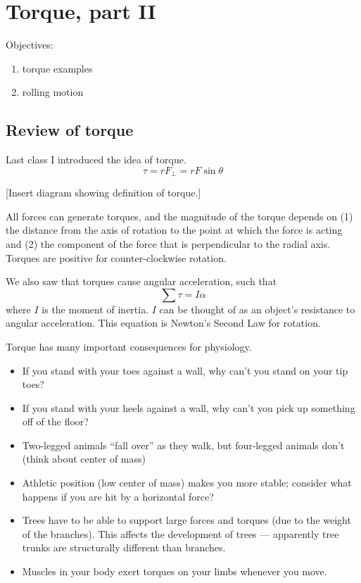 \section{Torque, part II}
Objectives:
\begin{enumerate}
\item torque examples
\item rolling motion
\end{enumerate}

\hrulefill

\subsection{Review of torque}
Last class I introduced the idea of torque.
$$\tau=rF_\perp=rF\sin\theta$$

[Insert diagram showing definition of torque.]
\vspace{5cm}

All forces can generate torques, and the magnitude of the torque depends on (1) the distance from the axis of rotation to the point at which the force is acting and (2) the component of the force that is perpendicular to the radial axis. Torques are positive for counter-clockwise rotation.

We also saw that torques cause angular acceleration, such that
$$\sum \tau=I\alpha$$
where $I$ is the moment of inertia. $I$ can be thought of as an object's resistance to angular acceleration. This equation is Newton's Second Law for rotation.

Torque has many important consequences for physiology.
\begin{itemize}
\item If you stand with your toes against a wall, why can't you stand on your tip toes?
\item If you stand with your heels against a wall, why can't you pick up something off of the floor?
\item Two-legged animals ``fall over'' as they walk, but four-legged animals don't (think about center of mass)
\item Athletic position (low center of mass) makes you more stable; consider what happens if you are hit by a horizontal force?
\item Trees have to be able to support large forces and torques (due to the weight of the branches). This affects the development of trees --- apparently tree trunks are structurally different than branches.
  \item Muscles in your body exert torques on your limbs whenever you move.
\end{itemize}
    
